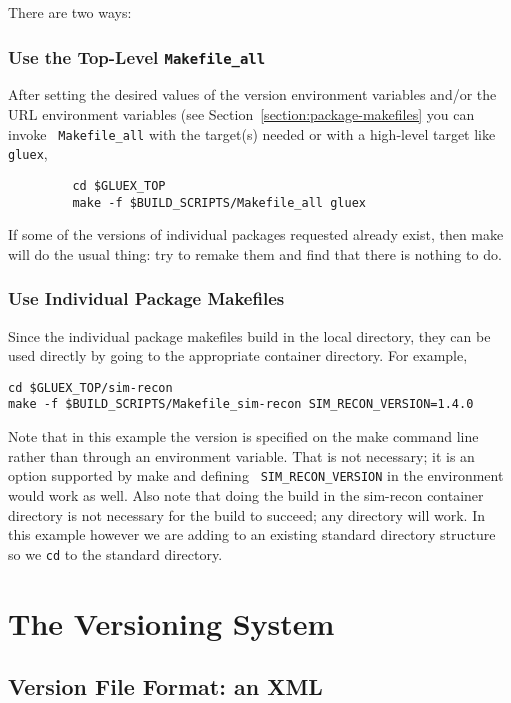 \documentclass[12pt]{article}
\begin{document}
There are two ways:

\subsubsection{Use the Top-Level {\tt Makefile\_all}}

After setting the desired values of the version environment variables
and/or the URL environment variables (see
Section~\ref{section:package-makefiles} you can invoke {\tt
  Makefile\_all} with the target(s) needed or with a high-level target
like {\tt gluex},
\begin{verbatim}
         cd $GLUEX_TOP
         make -f $BUILD_SCRIPTS/Makefile_all gluex
\end{verbatim}
If some of the versions of individual packages requested already
exist, then make will do the usual thing: try to remake them and find
that there is nothing to do.

\subsubsection{Use Individual Package Makefiles}

Since the individual package makefiles build in the local directory,
they can be used directly by going to the appropriate container
directory. For example,
\begin{verbatim}
cd $GLUEX_TOP/sim-recon
make -f $BUILD_SCRIPTS/Makefile_sim-recon SIM_RECON_VERSION=1.4.0
\end{verbatim}
Note that in this example the version is specified on the make command
line rather than through an environment variable. That is not
necessary; it is an option supported by make and defining {\tt
  SIM\_RECON\_VERSION} in the environment would work as well. Also
note that doing the build in the sim-recon container directory is not
necessary for the build to succeed; any directory will work. In this
example however we are adding to an existing standard directory
structure so we {\tt cd} to the standard directory.

\section{The Versioning System}\label{section:versioning}

\subsection{Version File Format: an XML}
\end{document}
